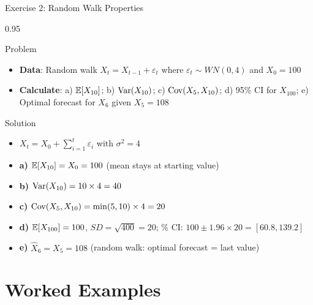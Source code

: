 \documentclass[9pt, aspectratio=169, t]{beamer}
\begin{document}
\begin{frame}{Exercise 2: Random Walk Properties}
    \begin{cminipage}{0.95\textwidth}
    \begin{alertblock}{Problem}
        \begin{itemize}\setlength{\itemsep}{0pt}
            \item \textbf{Data}: Random walk $X_t = X_{t-1} + \varepsilon_t$ where $\varepsilon_t \sim WN(0, 4)$ and $X_0 = 100$
            \item \textbf{Calculate}: a) $\mathbb{E}[X_{10}]$; b) $\text{Var}(X_{10})$; c) $\text{Cov}(X_5, X_{10})$; d) 95\% CI for $X_{100}$; e) Optimal forecast for $X_6$ given $X_5 = 108$
        \end{itemize}
    \end{alertblock}

    \vspace{0.2cm}
    \begin{exampleblock}{Solution}
        \begin{itemize}\setlength{\itemsep}{0pt}
            \item $X_t = X_0 + \sum_{i=1}^{t} \varepsilon_i$ with $\sigma^2 = 4$
            \item \textbf{a)} $\mathbb{E}[X_{10}] = X_0 = 100$ \quad (mean stays at starting value)
            \item \textbf{b)} $\text{Var}(X_{10}) = 10 \times 4 = 40$
            \item \textbf{c)} $\text{Cov}(X_5, X_{10}) = \min(5, 10) \times 4 = 20$
            \item \textbf{d)} $\mathbb{E}[X_{100}] = 100$, $SD = \sqrt{400} = 20$; \% CI: $100 \pm 1.96 \times 20 = [60.8, 139.2]$
            \item \textbf{e)} $\hat{X}_6 = X_5 = 108$ \quad (random walk: optimal forecast = last value)
        \end{itemize}
    \end{exampleblock}
    \end{cminipage}
\end{frame}

\section{Worked Examples}
\end{document}
